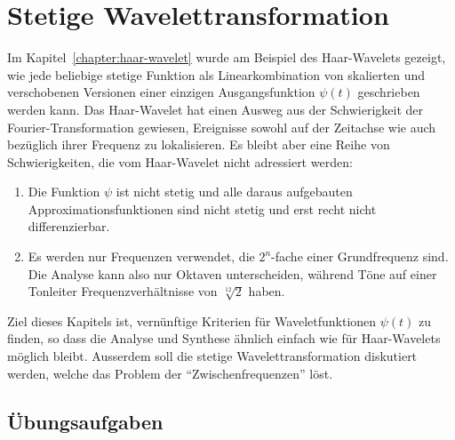 %
%
%
\chapter{Stetige Wavelettransformation
\label{chapter:cwt}}
Im Kapitel~\ref{chapter:haar-wavelet} wurde am Beispiel des Haar-Wavelets
gezeigt, wie jede beliebige stetige Funktion als Linearkombination 
von skalierten und verschobenen Versionen einer einzigen Ausgangsfunktion
$\psi(t)$ geschrieben werden kann.
Das Haar-Wavelet hat einen Ausweg aus der Schwierigkeit der
Fourier-Transformation gewiesen, Ereignisse sowohl auf der Zeitachse
wie auch bezüglich ihrer Frequenz zu lokalisieren.
Es bleibt aber eine Reihe von Schwierigkeiten, die vom Haar-Wavelet nicht
adressiert werden:
\begin{enumerate}
\item
Die Funktion $\psi$ ist nicht stetig und alle daraus aufgebauten
Approximationsfunktionen sind nicht stetig
und erst recht nicht differenzierbar.
\item
Es werden nur Frequenzen verwendet, die $2^n$-fache einer Grundfrequenz
sind.
Die Analyse kann also nur Oktaven unterscheiden, während
%
Töne auf einer Tonleiter Frequenzverhältnisse von $\sqrt[12]{2}$ haben.
%
\end{enumerate}
Ziel dieses Kapitels ist, vernünftige Kriterien für Waveletfunktionen
$\psi(t)$ zu finden, so dass die Analyse und Synthese ähnlich einfach
wie für Haar-Wavelets möglich bleibt.
Ausserdem soll die stetige Wavelettransformation diskutiert werden,
welche das Problem der ``Zwischenfrequenzen'' löst.
%






\section*{Übungsaufgaben}

